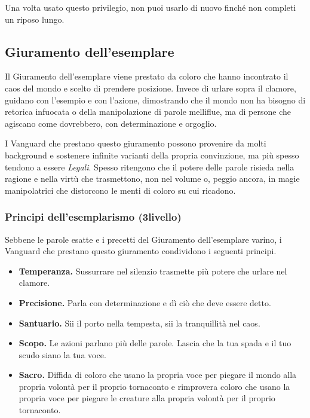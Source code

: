 \documentclass[a4paper,10pt,twoside,twocolumn,openany,bg=full,nodeprecatedcode]{dndbook}
\begin{document}
Una volta usato questo privilegio, non puoi usarlo di nuovo finché non completi un riposo lungo.

\subsection{Giuramento dell'esemplare}

Il Giuramento dell'esemplare viene prestato da coloro che hanno incontrato il caos del mondo e scelto di prendere posizione.
Invece di urlare sopra il clamore, guidano con l'esempio e con l'azione, dimostrando che il mondo non ha bisogno di retorica infuocata o della manipolazione di parole melliflue, ma di persone che agiscano come dovrebbero, con determinazione e orgoglio.

I Vanguard che prestano questo giuramento possono provenire da molti background e sostenere infinite varianti della propria convinzione, ma più spesso tendono a essere \emph{Legali}.
Spesso ritengono che il potere delle parole risieda nella ragione e nella virtù che trasmettono, non nel volume o, peggio ancora, in magie manipolatrici che distorcono le menti di coloro su cui ricadono.

\subsubsection{Principi dell'esemplarismo (3\degree livello)}

Sebbene le parole esatte e i precetti del Giuramento dell'esemplare varino, i Vanguard che prestano questo giuramento condividono i seguenti principi.

\begin{itemize}
  \item \textbf{Temperanza.} Sussurrare nel silenzio trasmette più potere che urlare nel clamore.
  \item \textbf{Precisione.} Parla con determinazione e dì ciò che deve essere detto.
  \item \textbf{Santuario.} Sii il porto nella tempesta, sii la tranquillità nel caos.
  \item \textbf{Scopo.} Le azioni parlano più delle parole. Lascia che la tua spada e il tuo scudo siano la tua voce.
  \item \textbf{Sacro.} Diffida di coloro che usano la propria voce per piegare il mondo alla propria volontà per il proprio tornaconto e rimprovera coloro che usano la propria voce per piegare le creature alla propria volontà per il proprio tornaconto.
\end{itemize}
\end{document}

